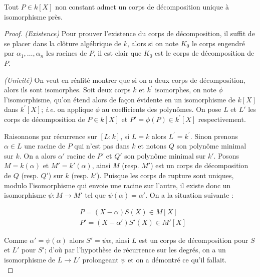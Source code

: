 \documentclass[a4paper]{article} %
\numberwithin{section}{part}
\numberwithin{equation}{section}
\begin{document}
\begin{thm}
\label{cor:dec}
Tout $P\in k[X]$ non constant admet un corps de décomposition unique à 
isomorphisme près.
\end{thm}
\begin{proof}
\textit{(Existence)}
Pour prouver l'existence du corps de décomposition, il suffit de se placer 
dans la clôture algébrique de $k$, alors si on note $K_0$ le corps engendré 
par $\alpha_1,\dots,\alpha_n$ les racines de $P$, il est clair que $K_0$ est 
le corps de décomposition de $P$.\par
\textit{(Unicité)}
On veut en réalité montrer que si on a deux corps de décomposition, alors ils 
sont isomorphes. Soit deux corps $k$ et $k^{\prime}$ isomorphes, on note $\phi$
l'isomorphisme, qu'on étend alors de façon évidente en un isomorphisme de $k[X]$
dans $k^{\prime}[X]$; \textit{i.e.} on applique $\phi$ au coefficients des 
polynômes. On pose  $L$ et $L'$ les corps de décomposition de $P\in k[X]$ et $P'
= \phi(P) \in k^{\prime}[X]$ respectivement.\par
Raisonnons par récurrence sur $[L:k]$, si $L = k$ alors $L^{\prime} =
k^{\prime}$. Sinon prenons $\alpha\in L$ une racine de $P$ qui n'est pas dans
$k$ et notons $Q$ son polynôme minimal sur $k$. On a alors $\alpha'$ racine de 
$P'$ et $Q'$ son polynôme minimal sur $k'$. Posons $M = k(\alpha)$ et $M' =
k'(\alpha)$, ainsi $M$ (resp. $M'$) est un corps de décomposition de $Q$ (resp.
$Q'$) sur $k$ (resp. $k'$). Puisque les corps de rupture sont uniques, modulo
l'isomorphisme qui envoie une racine sur l'autre, il existe donc un isomorphisme
$\psi : M \to M'$ tel que $\psi(\alpha) = \alpha'$. On a la situation suivante :

\begin{align*}
&P = (X - \alpha)S(X)\in M[X]\\
&P' = (X - \alpha')S'(X)\in M'[X]
\end{align*}

Comme $\alpha' = \psi(\alpha)$ alors $S'=\psi{\alpha}$, ainsi $L$ est un corps
de décomposition pour $S$ et $L'$ pour $S'$; d'où par l'hypothèse de récurrence
sur les degrés, on a un isomorphisme de $L \to L'$ prolongeant $\psi$ et on a 
démontré ce qu'il fallait.\\
\end{proof}
\end{document}
